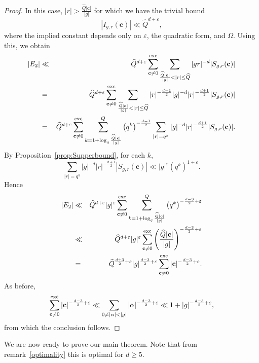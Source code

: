 \documentclass[11pt]{amsart}
\theoremstyle{plain}
\theoremstyle{plain}
\renewcommand{\vec}[1]{\mathbf{#1}}
\theoremstyle{remark}
\theoremstyle{definition}
\newcommand{\hQ}{\widehat{Q}}
\newcommand{\exc}{\textup{exc}}
\begin{document}
\begin{proof}
In this case, $|r|>\frac{\hQ|\vec{c}|}{|g|}$ for which we have the trivial bound
\[|I_{g,r}(\vec{c})|\ll\hQ^{d+\varepsilon},\]
where the implied constant depends only on $\varepsilon$, the quadratic form, and $\Omega$. Using this, we obtain
\begin{eqnarray*}|E_2| &\ll& \hQ^{d+\varepsilon}\sum_{\vec{c}\neq 0}^{\exc}\sum_{\frac{\hQ |\vec{c}|}{|g|}< |r|\leq \hQ}|gr|^{-d}|S_{g,r}(\vec{c})|\\ &=&\hQ^{d+\varepsilon}\sum_{\vec{c}\neq 0}^{\exc}\sum_{\frac{\hQ |\vec{c}|}{|g|}< |r|\leq \hQ}|r|^{-\frac{d-1}{2}}|g|^{-d}|r|^{-\frac{d+1}{2}}|S_{g,r}(\vec{c})|\\ &=& \hQ^{d+\varepsilon}\sum_{\vec{c}\neq 0}^{\exc}\sum_{k=1+\log_q\frac{\hQ |\vec{c}|}{|g|}}^Q\left(q^k\right)^{-\frac{d-1}{2}}\sum_{|r|=q^k}|g|^{-d}|r|^{-\frac{d+1}{2}}|S_{g,r}(\vec{c})|.
\end{eqnarray*}
By Proposition~\ref{prop:Supperbound}, for each $k$, 
\[\sum_{|r|=q^k}|g|^{-d}|r|^{-\frac{d+1}{2}}|S_{g,r}(\vec{c})|\ll |g|^{\varepsilon}(q^k)^{1+\varepsilon}.\]
Hence
\begin{eqnarray*}|E_2|&\ll& \hQ^{d+\varepsilon}|g|^{\varepsilon}\sum_{\vec{c}\neq 0}^{\exc}\sum_{k=1+\log_q\frac{\hQ |\vec{c}|}{|g|}}^Q\left(q^k\right)^{-\frac{d-3}{2}+\varepsilon}\\&\ll& \hQ^{d+\varepsilon}|g|^{\varepsilon}\sum_{\vec{c}\neq 0}^{\exc}\left(\frac{\hQ |\vec{c}|}{|g|}\right)^{-\frac{d-3}{2}+\varepsilon}\\&=&\hQ^{\frac{d+3}{2}+\varepsilon}|g|^{\frac{d-3}{2}+\varepsilon}\sum_{\vec{c}\neq 0}^{\exc}|\vec{c}|^{-\frac{d-3}{2}+\varepsilon}.
\end{eqnarray*}
As before,
\[\sum_{\vec{c}\neq 0}^{\exc}|\vec{c}|^{-\frac{d-3}{2}+\varepsilon}\ll \sum_{0\neq|\alpha|<|g|}|\alpha|^{-\frac{d-3}{2}+\varepsilon}\ll 1+|g|^{-\frac{d-5}{2}+\varepsilon},\]
from which the conclusion follows.
\end{proof}
We are now ready to prove our main theorem. Note that from remark~\ref{optimality} this is optimal for $d\geq 5$.
\end{document}
